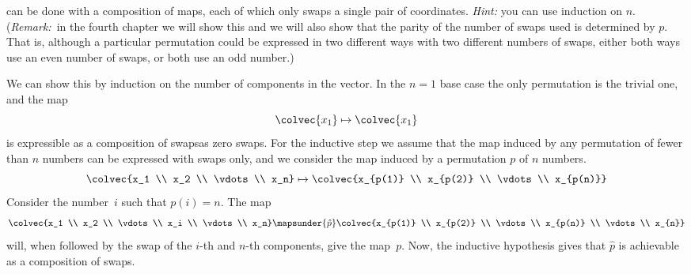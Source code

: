 \begin{exercises}
\begin{equation*}
    \end{equation*}
    can be done with a composition of maps, 
    each of which only swaps a single pair of coordinates.
    \textit{Hint:} you can use induction on $n$.
    (\textit{Remark:}~in the fourth chapter we will show this and we will also 
    show that the parity of the number of swaps used is determined by $p$.
    That is, although a particular
    permutation could be expressed in two different ways
    with two different numbers of swaps, either both ways use an even number of
    swaps, or both use an odd number.)
    \begin{answer}
      We can show this by induction on the number of components in the 
      vector.
      In the $n=1$ base case the only permutation is the trivial one,
      and the map
      \begin{equation*}
        \colvec{x_1}
        \mapsto
        \colvec{x_1}
      \end{equation*}
      is expressible as a composition of swaps\Dash as zero swaps.
      For the inductive step we assume that the map induced by 
      any permutation of fewer than
      $n$ numbers can be expressed with swaps only, and we consider the map
      induced by a 
      permutation $p$ of $n$ numbers.
      \begin{equation*}
        \colvec{x_1 \\ x_2 \\ \vdots \\ x_n}
        \mapsto
        \colvec{x_{p(1)} \\ x_{p(2)} \\ \vdots \\ x_{p(n)}}
      \end{equation*}
      Consider the number~$i$ such that $p(i)=n$.
      The map      
      \begin{equation*}
        \colvec{x_1      \\ x_2      \\ \vdots \\ x_i      \\ \vdots \\ x_n}
        \mapsunder{\hat{p}}
        \colvec{x_{p(1)} \\ x_{p(2)} \\ \vdots \\ x_{p(n)} \\ \vdots  \\ x_{n}}
      \end{equation*}
      will, when followed by the swap of the $i$-th and $n$-th components, 
      give the map~$p$.
      Now, the inductive hypothesis gives that $\hat{p}$ is achievable as 
      a composition of swaps.
    \end{answer}
\end{exercises}
\endinput


